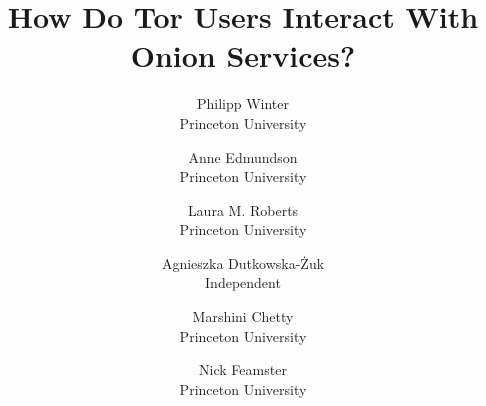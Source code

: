\documentclass[letterpaper,twocolumn,10pt]{article}
\begin{document}
\date{}

\title{
    {\Large \textbf{How Do Tor Users Interact With Onion Services?}}
}

\author{
	{\rm \phantom{ZZZZ}Philipp Winter\phantom{ZZZZ}} \\
	Princeton University
	\and
	{\rm \phantom{ZZZZ}Anne Edmundson\phantom{ZZZZ}} \\
	Princeton University
	\and
	{\rm \phantom{ZZZ}Laura M. Roberts\phantom{ZZZ}} \\
	Princeton University
	\and
	{\rm Agnieszka Dutkowska-Żuk} \\
	Independent
	\and
	{\rm \phantom{ZZZZ}Marshini Chetty\phantom{ZZZZ}} \\
	Princeton University
	\and
	{\rm \phantom{ZZZZ}Nick Feamster\phantom{ZZZZ}} \\
	Princeton University
}

\maketitle

\thispagestyle{empty}



















{\footnotesize
\printbibliography}
\end{document}
